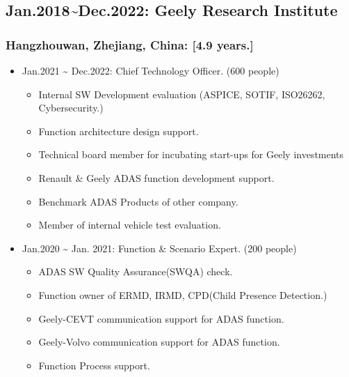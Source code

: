 \documentclass[12pt,a4paper]{article}
\begin{document}
\subsection{Jan.2018{\textasciitilde}Dec.2022: Geely Research Institute}
\subsubsection{Hangzhouwan, Zhejiang, China: [4.9 years.]}
\begin{itemize}
\item Jan.2021 {\textasciitilde} Dec.2022: Chief Technology Officer. (600 people)

\begin{itemize}
\item Internal SW Development evaluation (ASPICE, SOTIF, ISO26262, Cybersecurity.)


\item Function architecture design support.


\item Technical board member for incubating start-ups for Geely investments


\item Renault \& Geely ADAS function development support.


\item Benchmark ADAS Products of other company.


\item Member of internal vehicle test evaluation.

\end{itemize}

\item Jan.2020 {\textasciitilde} Jan. 2021: Function \& Scenario Expert. (200 people)

\begin{itemize}
\item ADAS SW Quality Assurance(SWQA) check.


\item Function owner of ERMD, IRMD, CPD(Child Presence Detection.)


\item Geely-CEVT communication support for ADAS function.


\item Geely-Volvo communication support for ADAS function.


\item Function Process support. 

\end{itemize}


\end{itemize}
\end{document}
